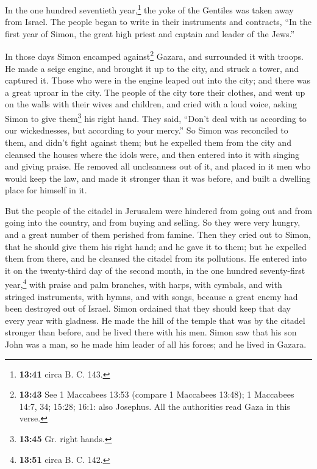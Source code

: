  In the one hundred seventieth year,\footnote{\textbf{13:41}
  circa B. C. 143.} the yoke of the Gentiles was taken away from Israel.
 The people began to write in their instruments and
contracts, ``In the first year of Simon, the great high priest and
captain and leader of the Jews.''

 In those days Simon encamped against\footnote{\textbf{13:43}
  See 1 Maccabees 13:53 (compare 1 Maccabees 13:48); 1 Maccabees 14:7,
  34; 15:28; 16:1: also Josephus. All the authorities read Gaza in this
  verse.} Gazara, and surrounded it with troops. He made a seige engine,
and brought it up to the city, and struck a tower, and captured it.
 Those who were in the engine leaped out into the city;
and there was a great uproar in the city.  The people of
the city tore their clothes, and went up on the walls with their wives
and children, and cried with a loud voice, asking Simon to give
them\footnote{\textbf{13:45} Gr. right hands.} his right hand.
 They said, ``Don't deal with us according to our
wickednesses, but according to your mercy.''  So Simon
was reconciled to them, and didn't fight against them; but he expelled
them from the city and cleansed the houses where the idols were, and
then entered into it with singing and giving praise.  He
removed all uncleanness out of it, and placed in it men who would keep
the law, and made it stronger than it was before, and built a dwelling
place for himself in it.

 But the people of the citadel in Jerusalem were hindered
from going out and from going into the country, and from buying and
selling. So they were very hungry, and a great number of them perished
from famine.  Then they cried out to Simon, that he
should give them his right hand; and he gave it to them; but he expelled
them from there, and he cleansed the citadel from its pollutions.
 He entered into it on the twenty-third day of the second
month, in the one hundred seventy-first year,\footnote{\textbf{13:51}
  circa B. C. 142.} with praise and palm branches, with harps, with
cymbals, and with stringed instruments, with hymns, and with songs,
because a great enemy had been destroyed out of Israel. 
Simon ordained that they should keep that day every year with gladness.
He made the hill of the temple that was by the citadel stronger than
before, and he lived there with his men.  Simon saw that
his son John was a man, so he made him leader of all his forces; and he
lived in Gazara.

